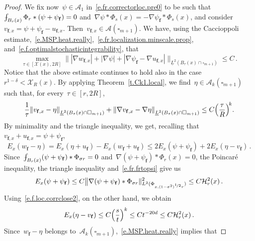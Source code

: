 \documentclass[11pt,twoside]{article} %
\let\oldsquare\square %
\renewcommand{\square}{\oldsquare}
\numberwithin{equation}{section}
\theoremstyle{definition}
\let\originalleft\left
\let\originalright\right
\renewcommand{\left}{\mathopen{}\mathclose\bgroup\originalleft}
\renewcommand{\right}{\aftergroup\egroup\originalright}
\newcommand{\f}{\mathbf{f}}
\newcommand{\cu}{\square}
\newcommand{\X}{\mathcal{X}}
\def\Xint#1{\mathchoice
{\XXint\displaystyle\textstyle{#1}}%
{\XXint\textstyle\scriptstyle{#1}}%
{\XXint\scriptstyle\scriptscriptstyle{#1}}%
{\XXint\scriptscriptstyle\scriptscriptstyle{#1}}%
\!\int}
\def\XXint#1#2#3{{\setbox0=\hbox{$#1{#2#3}{\int}$}
\vcenter{\hbox{$#2#3$}}\kern-.5\wd0}}
\def\fint{\Xint-}
\newcommand{\A}{\mathcal{A}}
\begin{document}
\begin{proof}
We fix now~$\psi \in \A_1$ in~\eqref{e.fr.correctorloc.pre0} to be such that~$\fint_{B_r(x)} \Phi_r \ast (\psi  + \psi_{\f}) = 0$ and~$\nabla \psi  \ast \Phi_{s}(x) = - \nabla \psi_{\f} \ast \Phi_{s}(x)$, and consider~$v_{\f,x} = \psi  + \psi_{\f} - u_{\f,x}$. Then~$v_{\f,x} \in \A(\cu_{m+1})$.  We have, using the Caccioppoli estimate,~\eqref{e.MSP.heat.really},~\eqref{e.fr.localization.minscale.prop},  and~\eqref{e.f.optimalstochasticintegrability}, that
\begin{equation}  \label{e.fr.local.bnd}
\max_{\tau \in [\X(x) , 2R]}\big\| |\nabla w_{\f,x} | +  |\nabla \psi | + |\nabla \psi_{\f} - \nabla u_{\f,x}| \big\|_{\underline{L}^2(B_\tau(x) \cap \cu_{m+1})} 
\leq 
C 
\,.
\end{equation}
Notice that the above estimate continues to hold also in the case~$r^{1-\delta} < \X_{R}(x)$. 
By applying Theorem~\ref{t.Ck1.local}, 
we find~$\eta \in  \A_{k}(\cu_{m+1})$ such that, for every~$\tau  \in [r,2R]$, 
\begin{equation} \label{e.f.loc.corrclose2}
\frac1\tau \left\|  v_{\f,x} -  \eta \right\|_{\underline{L}^2 \left( B_{\tau}(x) \cap \cu_{m+1} \right)} 
+
\left\|  \nabla v_{\f,x} -   \nabla  \eta \right\|_{\underline{L}^2 \left( B_{\tau}(x) \cap \cu_{m+1} \right)} 
\leq 
C\left( \frac{\tau}{R}\right)^{\!k} .
\end{equation}
By minimality and the triangle inequality, we get, recalling that~$v_{\f,x} + u_{\f,x} = \psi  + \psi_{\f}$,
\begin{equation*}  
E_x(w_{\f}-\eta) 
= 
E_x(\eta + u_{\f}) - E_x(w_{\f} + u_{\f}) 
\leq 
2 E_x(\psi  + \psi_{\f}) +  2 E_x(\eta - v_{\f}) 
\,.
\end{equation*}
Since~$\fint_{B_r(x)} (\psi + \psi_{\f}) \ast \Phi_{\sigma r} = 0$ and~$\nabla (\psi  + \psi_{\f}) \ast \Phi_{r}(x) = 0$, the Poincar\'e inequality, the triangle inequality and~\eqref{e.fr.frtopsi} give us
\begin{equation*}  
E_x(\psi  + \psi_{\f}) 
\leq
C  \big\| \nabla (\psi  + \psi_{\f}) \ast \Phi_{\sigma r} \|_{L^2(\Phi_{x,(1-\sigma^2)^{\nicefrac12} r})}^2
\leq
C \mathcal{H}_r^2(x) \,.
\end{equation*}
Using~\eqref{e.f.loc.corrclose2}, on the other hand, we obtain 
\begin{equation*}  
E_x(\eta - v_{\f}) 
\leq 
C \Bigl( \frac st \Bigr)^k 
 \leq 
 C t^{-20d}
 \leq
C \mathcal{H}_r^2(x)
\,.
\end{equation*}
Since~$w_{\f} - \eta$ belongs to~$\A_k(\cu_{m+1})$,~\eqref{e.MSP.heat.really} implies that 

\end{proof}
\end{document}
